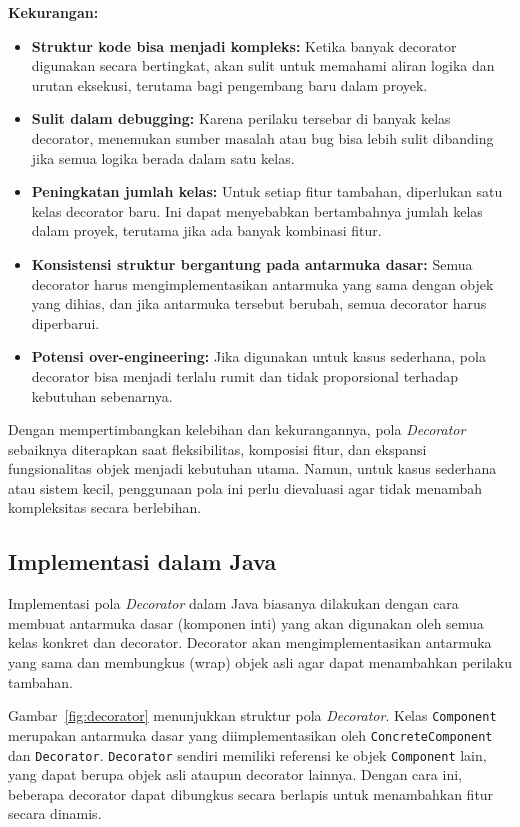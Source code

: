 \textbf{Kekurangan:}
\begin{itemize}
	\item \textbf{Struktur kode bisa menjadi kompleks:} Ketika banyak decorator digunakan secara bertingkat, akan sulit untuk memahami aliran logika dan urutan eksekusi, terutama bagi pengembang baru dalam proyek.
	
	\item \textbf{Sulit dalam debugging:} Karena perilaku tersebar di banyak kelas decorator, menemukan sumber masalah atau bug bisa lebih sulit dibanding jika semua logika berada dalam satu kelas.
	
	\item \textbf{Peningkatan jumlah kelas:} Untuk setiap fitur tambahan, diperlukan satu kelas decorator baru. Ini dapat menyebabkan bertambahnya jumlah kelas dalam proyek, terutama jika ada banyak kombinasi fitur.
	
	\item \textbf{Konsistensi struktur bergantung pada antarmuka dasar:} Semua decorator harus mengimplementasikan antarmuka yang sama dengan objek yang dihias, dan jika antarmuka tersebut berubah, semua decorator harus diperbarui.
	
	\item \textbf{Potensi over-engineering:} Jika digunakan untuk kasus sederhana, pola decorator bisa menjadi terlalu rumit dan tidak proporsional terhadap kebutuhan sebenarnya.
\end{itemize}

Dengan mempertimbangkan kelebihan dan kekurangannya, pola \textit{Decorator} sebaiknya diterapkan saat fleksibilitas, komposisi fitur, dan ekspansi fungsionalitas objek menjadi kebutuhan utama. Namun, untuk kasus sederhana atau sistem kecil, penggunaan pola ini perlu dievaluasi agar tidak menambah kompleksitas secara berlebihan.

\subsection{Implementasi dalam Java}

Implementasi pola \textit{Decorator} dalam Java biasanya dilakukan dengan cara membuat antarmuka dasar (komponen inti) yang akan digunakan oleh semua kelas konkret dan decorator. Decorator akan mengimplementasikan antarmuka yang sama dan membungkus (wrap) objek asli agar dapat menambahkan perilaku tambahan.

Gambar~\ref{fig:decorator} menunjukkan struktur pola \textit{Decorator}. Kelas \texttt{Component} merupakan antarmuka dasar yang diimplementasikan oleh \texttt{ConcreteComponent} dan \texttt{Decorator}. \texttt{Decorator} sendiri memiliki referensi ke objek \texttt{Component} lain, yang dapat berupa objek asli ataupun decorator lainnya. Dengan cara ini, beberapa decorator dapat dibungkus secara berlapis untuk menambahkan fitur secara dinamis.

